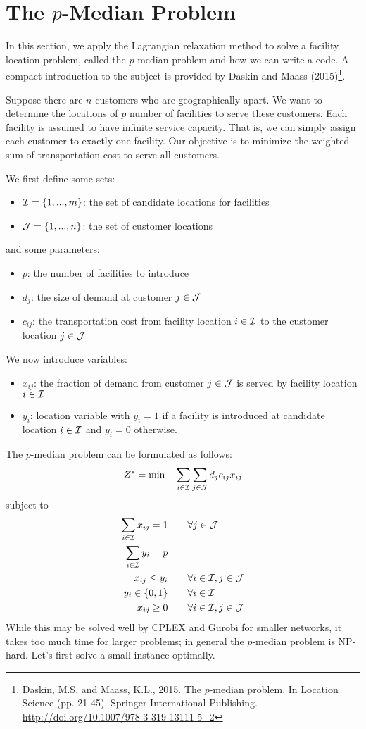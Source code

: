 %
%
%
%
\section{The $p$-Median Problem}

In this section, we apply the Lagrangian relaxation method to solve a facility location problem, called the $p$-median problem and how we can write a \julia{} code. A compact introduction to the subject is provided by Daskin and Maass (2015)\footnote{Daskin, M.S. and Maass, K.L., 2015. The $p$-median problem. In Location Science (pp. 21-45). Springer International Publishing. \url{http://doi.org/10.1007/978-3-319-13111-5_2}}.

Suppose there are $n$ customers who are geographically apart. We want to determine the locations of $p$ number of facilities to serve these customers. Each facility is assumed to have infinite service capacity. That is, we can simply assign each customer to exactly one facility. Our objective is to minimize the weighted sum of transportation cost to serve all customers.

We first define some sets:
\begin{itemize}
\item $\mathcal{I} = \{1,...,m\}$: the set of candidate locations for facilities
\item $\mathcal{J} = \{1,...,n\}$: the set of customer locations
\end{itemize}
and some parameters:
\begin{itemize}
\item $p$: the number of facilities to introduce
\item $d_j$: the size of demand at customer $j\in\mathcal{J}$
\item $c_{ij}$: the transportation cost from facility location $i\in\mathcal{I}$ to the customer location $j\in\mathcal{J}$
\end{itemize}
We now introduce variables:
\begin{itemize}
\item $x_{ij}$: the fraction of demand from customer $j\in\mathcal{J}$ is served by facility location $i\in\mathcal{I}$
\item $y_i$: location variable with $y_i=1$ if a facility is introduced at candidate location $i\in\mathcal{I}$ and $y_i=0$ otherwise.
\end{itemize}

The $p$-median problem can be formulated as follows:
\[
	Z^* = \min \quad \sum_{i\in\mathcal{I}} \sum_{j\in\mathcal{J}} d_j c_{ij} x_{ij}
\]
subject to
\begin{align*}
	\sum_{i\in\mathcal{I}} x_{ij} = 1 & \qquad \forall j\in\mathcal{J} \\
	\sum_{i\in\mathcal{I}} y_i = p & \\
	x_{ij} \leq y_i & \qquad \forall i\in\mathcal{I}, j\in\mathcal{J} \\
	y_i \in \{0,1\} & \qquad \forall i\in\mathcal{I} \\
	x_{ij} \geq 0 & \qquad \forall i\in\mathcal{I}, j\in\mathcal{J}
\end{align*}
While this may be solved well by CPLEX and Gurobi for smaller networks, it takes too much time for larger problems; in general the $p$-median problem is NP-hard. Let's first solve a small instance optimally.




